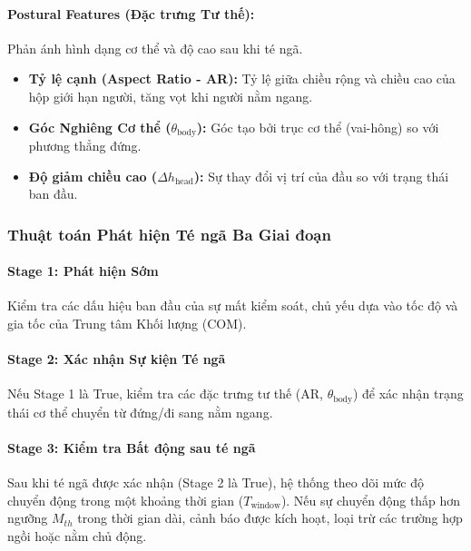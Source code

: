 \paragraph{Postural Features (Đặc trưng Tư thế):} Phản ánh hình dạng cơ thể và độ cao sau khi té ngã.
\begin{itemize}
    \item \textbf{Tỷ lệ cạnh (Aspect Ratio - AR):} Tỷ lệ giữa chiều rộng và chiều cao của hộp giới hạn người, tăng vọt khi người nằm ngang.
    \item \textbf{Góc Nghiêng Cơ thể ($\theta_{\text{body}}$):} Góc tạo bởi trục cơ thể (vai-hông) so với phương thẳng đứng.
    \item \textbf{Độ giảm chiều cao ($\Delta h_{\text{head}}$):} Sự thay đổi vị trí của đầu so với trạng thái ban đầu.
\end{itemize}

\subsubsection{Thuật toán Phát hiện Té ngã Ba Giai đoạn}

\paragraph{Stage 1: Phát hiện Sớm}
Kiểm tra các dấu hiệu ban đầu của sự mất kiểm soát, chủ yếu dựa vào tốc độ và gia tốc của Trung tâm Khối lượng (COM).

\paragraph{Stage 2: Xác nhận Sự kiện Té ngã}
Nếu Stage 1 là True, kiểm tra các đặc trưng tư thế (AR, $\theta_{\text{body}}$) để xác nhận trạng thái cơ thể chuyển từ đứng/đi sang nằm ngang.

\paragraph{Stage 3: Kiểm tra Bất động sau té ngã}
Sau khi té ngã được xác nhận (Stage 2 là True), hệ thống theo dõi mức độ chuyển động trong một khoảng thời gian ($T_{\text{window}}$). Nếu sự chuyển động thấp hơn ngưỡng $M_{th}$ trong thời gian dài, cảnh báo được kích hoạt, loại trừ các trường hợp ngồi hoặc nằm chủ động.
